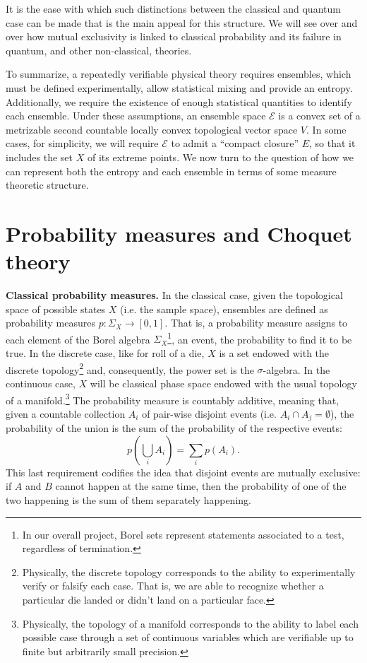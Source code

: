 \documentclass[10pt,twocolumn, nofootinbib]{revtex4-2}
\newcommand{\Ens}[1][E] {\mathcal{#1}} %
\begin{document}
It is the ease with which such distinctions between the classical and quantum case can be made that is the main appeal for this structure. We will see over and over how mutual exclusivity is linked to classical probability and its failure in quantum, and other non-classical, theories.

To summarize, a repeatedly verifiable physical theory requires ensembles, which must be defined experimentally, allow statistical mixing and provide an entropy. Additionally, we require the existence of enough statistical quantities to identify each ensemble. Under these assumptions, an ensemble space $\Ens$ is a convex set of a metrizable second countable locally convex topological vector space $V$. In some cases, for simplicity, we will require $\Ens$ to admit a ``compact closure'' $E$, so that it includes the set $X$ of its extreme points. We now turn to the question of how we can represent both the entropy and each ensemble in terms of some measure theoretic structure.

\section{Probability measures and Choquet theory}

\textbf{Classical probability measures.} In the classical case, given the topological space of possible states $X$ (i.e. the sample space), ensembles are defined as probability measures $p : \Sigma_X \to [0,1]$. That is, a probability measure assigns to each element of the Borel algebra $\Sigma_X$\footnote{In our overall project, Borel sets represent statements associated to a test, regardless of termination.}, an event, the probability to find it to be true. In the discrete case, like for roll of a die, $X$ is a set endowed with the discrete topology\footnote{Physically, the discrete topology corresponds to the ability to experimentally verify or falsify each case. That is, we are able to recognize whether a particular die landed or didn't land on a particular face.} and, consequently, the power set is the $\sigma$-algebra. In the continuous case, $X$ will be classical phase space endowed with the usual topology of a manifold.\footnote{Physically, the topology of a manifold corresponds to the ability to label each possible case through a set of continuous variables which are verifiable up to finite but arbitrarily small precision.}  The probability measure is countably additive, meaning that, given a countable collection $A_i$ of pair-wise disjoint events (i.e. $A_i \cap A_j = \emptyset$), the probability of the union is the sum of the probability of the respective events:
\begin{equation}
	p\left(\bigcup_i A_i \right) = \sum_i p(A_i).
\end{equation}
This last requirement codifies the idea that disjoint events are mutually exclusive: if $A$ and $B$ cannot happen at the same time, then the probability of one of the two happening is the sum of them separately happening.
\end{document}
